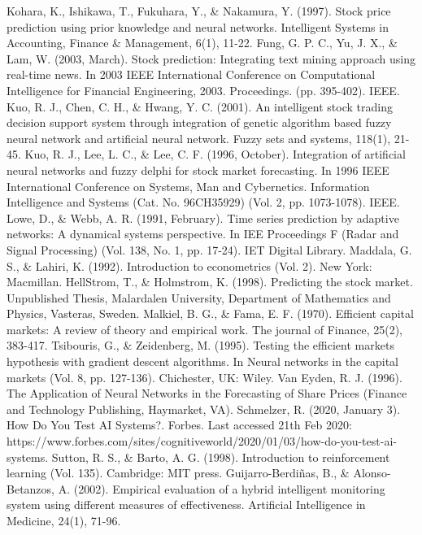 \documentclass[a4paper,12pt]{report}
\begin{document}
\begin{thebibliography}{9}
	Kohara, K., Ishikawa, T., Fukuhara, Y., \& Nakamura, Y. (1997). Stock price prediction using prior knowledge and neural networks. Intelligent Systems in Accounting, Finance \& Management, 6(1), 11-22.
	Fung, G. P. C., Yu, J. X., \& Lam, W. (2003, March). Stock prediction: Integrating text mining approach using real-time news. In 2003 IEEE International Conference on Computational Intelligence for Financial Engineering, 2003. Proceedings. (pp. 395-402). IEEE.
	Kuo, R. J., Chen, C. H., \& Hwang, Y. C. (2001). An intelligent stock trading decision support system through integration of genetic algorithm based fuzzy neural network and artificial neural network. Fuzzy sets and systems, 118(1), 21-45.
	Kuo, R. J., Lee, L. C., \& Lee, C. F. (1996, October). Integration of artificial neural networks and fuzzy delphi for stock market forecasting. In 1996 IEEE International Conference on Systems, Man and Cybernetics. Information Intelligence and Systems (Cat. No. 96CH35929) (Vol. 2, pp. 1073-1078). IEEE.
	Lowe, D., \& Webb, A. R. (1991, February). Time series prediction by adaptive networks: A dynamical systems perspective. In IEE Proceedings F (Radar and Signal Processing) (Vol. 138, No. 1, pp. 17-24). IET Digital Library.
	Maddala, G. S., \& Lahiri, K. (1992). Introduction to econometrics (Vol. 2). New York: Macmillan.
	HellStrom, T., \& Holmstrom, K. (1998). Predicting the stock market. Unpublished Thesis, Malardalen University, Department of Mathematics and Physics, Vasteras, Sweden.
	Malkiel, B. G., \& Fama, E. F. (1970). Efficient capital markets: A review of theory and empirical work. The journal of Finance, 25(2), 383-417.
	Tsibouris, G., \& Zeidenberg, M. (1995). Testing the efficient markets hypothesis with gradient descent algorithms. In Neural networks in the capital markets (Vol. 8, pp. 127-136). Chichester, UK: Wiley.
	Van Eyden, R. J. (1996). The Application of Neural Networks in the Forecasting of Share Prices (Finance and Technology Publishing, Haymarket, VA).
	Schmelzer, R. (2020, January 3). How Do You Test AI Systems?. Forbes. Last accessed 21th Feb 2020: https://www.forbes.com/sites/cognitiveworld/2020/01/03/how-do-you-test-ai-systems.
	Sutton, R. S., \& Barto, A. G. (1998). Introduction to reinforcement learning (Vol. 135). Cambridge: MIT press.
	\bibitem{}
	Guijarro-Berdiñas, B., \& Alonso-Betanzos, A. (2002). Empirical evaluation of a hybrid intelligent monitoring system using different measures of effectiveness. Artificial Intelligence in Medicine, 24(1), 71-96.
\end{thebibliography}
\end{document}
